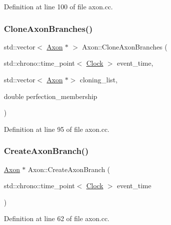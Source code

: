 Definition at line 100 of file axon.\+cc.

\mbox{\label{class_axon_af2d6d5bc9ee0cd8ff654a949ef1cc294}} 
\subsubsection{\texorpdfstring{Clone\+Axon\+Branches()}{CloneAxonBranches()}}
{\footnotesize\ttfamily std\+::vector$<$ \mbox{\hyperlink{class_axon}{Axon}} $\ast$ $>$ Axon\+::\+Clone\+Axon\+Branches (\begin{DoxyParamCaption}\item[{std\+::chrono\+::time\+\_\+point$<$ \mbox{\hyperlink{universe_8h_a0ef8d951d1ca5ab3cfaf7ab4c7a6fd80}{Clock}} $>$}]{event\+\_\+time,  }\item[{std\+::vector$<$ \mbox{\hyperlink{class_axon}{Axon}} $\ast$$>$}]{cloning\+\_\+list,  }\item[{double}]{perfection\+\_\+membership }\end{DoxyParamCaption})}



Definition at line 95 of file axon.\+cc.

\mbox{\label{class_axon_a41e97ead4c793003db2de87061574c26}} 
\subsubsection{\texorpdfstring{Create\+Axon\+Branch()}{CreateAxonBranch()}}
{\footnotesize\ttfamily \mbox{\hyperlink{class_axon}{Axon}} $\ast$ Axon\+::\+Create\+Axon\+Branch (\begin{DoxyParamCaption}\item[{std\+::chrono\+::time\+\_\+point$<$ \mbox{\hyperlink{universe_8h_a0ef8d951d1ca5ab3cfaf7ab4c7a6fd80}{Clock}} $>$}]{event\+\_\+time }\end{DoxyParamCaption})}



Definition at line 62 of file axon.\+cc.

